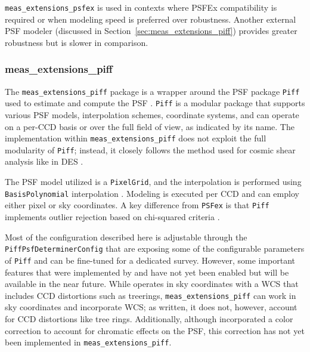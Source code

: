 \texttt{meas\_extensions\_psfex} is used in contexts where PSFEx compatibility is required or when modeling speed is preferred over robustness.
Another external PSF modeler (discussed in Section~\ref{sec:meas_extensions_piff}) provides greater robustness but is slower in comparison.

\subsubsection{meas\_extensions\_piff}

The \texttt{meas\_extensions\_piff} package is a wrapper around the PSF package \texttt{Piff} used to estimate and compute the PSF \citep{2021ascl.soft02024J,2021MNRAS.501.1282J}.
\texttt{Piff} is a modular package that supports various PSF models, interpolation schemes, coordinate systems, and can operate on
a per-CCD basis or over the full field of view, as indicated by its name.
The implementation within  \texttt{meas\_extensions\_piff} does not exploit the full modularity of \texttt{Piff}; instead, it closely follows the method used for cosmic shear analysis like in DES \citep{2021MNRAS.501.1282J,2025OJAp....8E..26S}.

The PSF model utilized is a \texttt{PixelGrid}, and the interpolation is performed using \texttt{BasisPolynomial} interpolation \citep{2021MNRAS.501.1282J}.
Modeling is executed per CCD and can employ either pixel or sky coordinates.
A key difference from \texttt{PSFex} is that  \texttt{Piff} implements outlier rejection based on chi-squared criteria \citep[see][for more details]{2021MNRAS.501.1282J}.

Most of the configuration described here is adjustable through the \texttt{PiffPsfDeterminerConfig} that are exposing some of the configurable parameters of \texttt{Piff} and can be fine-tuned for a dedicated survey.
However, some important features that were implemented by \citet{2021MNRAS.501.1282J} and \citet{2025OJAp....8E..26S} have not yet been enabled but will be available in the near future.
While \citet{2021MNRAS.501.1282J} operates in sky coordinates with a WCS that includes CCD distortions such as treerings,  \texttt{meas\_extensions\_piff} can work in sky coordinates and incorporate WCS; as written, it does not, however, account for CCD distortions like tree rings.
Additionally, although \citet{2025OJAp....8E..26S} incorporated a color correction to account for chromatic effects on the PSF, this correction has not yet been implemented in  \texttt{meas\_extensions\_piff}.
